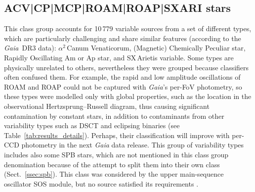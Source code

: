 \documentclass[longauth]{aa}
\def\gaia{\textit{Gaia}\xspace}
\def\gdr3{\textit{Gaia}~DR3\xspace}
\begin{document}
\subsection{ACV|CP|MCP|ROAM|ROAP|SXARI stars\label{ssec:acv}}

This class group accounts for 10\,779 variable sources from a set of different types, which are particularly challenging and share similar features (according to the \gdr3 data): $\alpha^2$\,Canum Venaticorum, (Magnetic) Chemically Peculiar star, Rapidly Oscillating Am or Ap star, and SX\,Arietis variable.  Some types are physically unrelated to others, nevertheless they were grouped because classifiers often confused them. For example, the rapid and low amplitude oscillations of ROAM and ROAP could not be captured with \gaia's per-FoV photometry, so these types were modelled only with global properties, such as the location in the observational Hertzsprung--Russell diagram, thus causing significant contamination by constant stars, in addition to contaminants from other variability types such as DSCT and eclipsing binaries (see Table~\ref{tab:results_details}). Perhaps, their classification will improve with per-CCD photometry in the next \gaia data release. 
This group of variability types includes also some SPB stars, which are not mentioned in this class group denomination because of the attempt to split them into their own class (Sect.~\ref{ssec:spb}).  
This class was considered by the upper main-sequence oscillator SOS module, but no source satisfied its requirements \citep[see sect.~10.14 of the \gdr3 documentation;][]{2022gdr3.reptE..10R}. 
\end{document}
